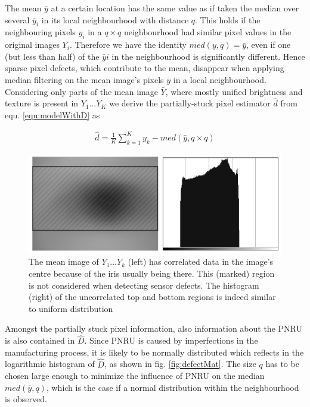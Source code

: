 \documentclass[10pt,twocolumn,letterpaper]{article}
\begin{document}
The mean $\bar{y}$ at a certain location has the same value as if taken the median over several $\bar{y}_i$ in its local neighbourhood with distance $q$. This holds if the neighbouring pixels ${y_i}$ in a $q \times q$ neighbourhood had similar pixel values in the original images $Y_i$. Therefore we have the identity $med(y,q) = \bar{y}$, even if one (but less than half) of the $\bar{y}i$ in the neighbourhood is significantly different. Hence sparse pixel defects, which contribute to the mean, disappear when applying median filtering on the mean image's pixels $\bar{y}$ in a local neighbourhood. Considering only parts of the mean image $\bar{Y}$, where mostly unified brightness and texture is present in $Y_1 \dots Y_K$ we derive the partially-stuck pixel estimator $\hat{d}$ from equ. \ref{equ:modelWithD} as

\begin{eqnarray}
\hat{d} = \frac{1}{K}\sum\limits_{k=1}^{K}y_k - med(\bar{y},q \times q) \label{equ:d}
\end{eqnarray}


\begin{figure}
  \centering
  \includegraphics[width=\linewidth]{img/correlated.png}
  \caption{The mean image of $Y_1 \dots Y_k$ (left) has correlated data in the image's centre because of the iris usually being there. This (marked) region is not considered when detecting sensor defects. The histogram (right) of the uncorrelated top and bottom regions is indeed similar to uniform distribution}
  \label{fig:correlated}
\end{figure}

Amongst the partially stuck pixel information, also information about the PNRU is also contained in $\hat{D}$. Since PNRU is caused by imperfections in the manufacturing process, it is likely to be normally distributed which reflects in the logarithmic histogram of $\hat{D}$, as shown in fig. \ref{fig:defectMat}. The size $q$ has to be chosen large enough to minimize the influence of PNRU on the median $med(\bar{y},q)$, which is the case if a normal distribution within the neighbourhood is observed.
\end{document}
